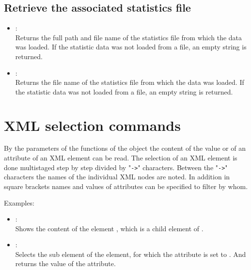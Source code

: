\section{Retrieve the associated statistics file}

\begin{itemize}

\item
{}:\\
Returns the full path and file name of the statistics file from which the data was loaded.
If the statistic data was not loaded from a file, an empty string is returned.

\item
{}:\\
Returns the file name of the statistics file from which the data was loaded.
If the statistic data was not loaded from a file, an empty string is returned.

\end{itemize}



\chapter{XML selection commands}

By the parameters of the functions of the  object the content of the
value or of an attribute of an XML element can be read.
The selection of an XML element is done multistaged step by step divided by
"\texttt{->}" characters. Between the "\texttt{->}" characters the names of the individual XML nodes are
noted. In addition in square brackets names and values of attributes can be specified to filter by whom.

Examples:

\begin{itemize}

\item
{}:\\
Shows the content of the element , which is a child element of .

\item
{}:\\
Selects the  sub element of the  element, for
which the  attribute is set to . And returns the value of the
 attribute.

\end{itemize}